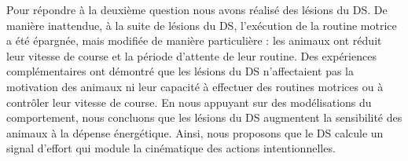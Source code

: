 Pour répondre à la deuxième question nous avons réalisé des lésions du DS.
De manière inattendue, à la suite de lésions du DS, l'exécution de la routine motrice a été épargnée, mais modifiée de manière particulière : 
    les animaux ont réduit leur vitesse de course et la période d'attente de leur routine.
Des expériences complémentaires ont démontré que les lésions du DS n'affectaient pas la motivation des animaux ni leur capacité à effectuer des routines motrices ou à contrôler leur vitesse de course.
En nous appuyant sur des modélisations du comportement, nous concluons que les lésions du DS augmentent la sensibilité des animaux à la dépense énergétique.
Ainsi, nous proposons que le DS calcule un signal d'effort qui module la cinématique des actions intentionnelles.
